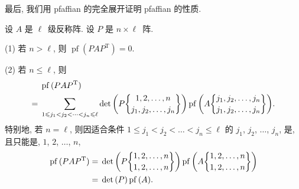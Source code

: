 \documentclass[../libro.tex]{subfiles}
\begin{document}
最后, 我们用 pfaffian 的完全展开证明 pfaffian 的性质.

\clearpage

\begin{theorem}
    设 \(A\) 是 \(\ell\)~级反称阵.
    设 \(P\) 是 \(n \times \ell\)~阵.

    (1)
    若 \(n > \ell\),
    则 \(\operatorname{pf} {(P A P^{\mathrm{T}})} = 0\).

    (2)
    若 \(n \leq \ell\),
    则
    \begin{align*}
        &
        \operatorname{pf} {(P A P^{\mathrm{T}})}
        \\
        = {} &
        \sum_{1 \leq j_1 < j_2 < \dots < j_{n} \leq \ell}
        {\det {\left(
                    P\submat{1,2,\dots,n}{j_1,j_2,\dots,j_{n}}
            \right)}
            \operatorname{pf} {\left(
                    A\submat{j_1,j_2,\dots,j_{n}}{j_1,j_2,\dots,j_{n}}
        \right)}}.
    \end{align*}
    特别地, 若 \(n = \ell\),
    则因适合条件
    \(1 \leq j_1 < j_2 < \dots < j_{n} \leq \ell\)
    的
    \(j_1\), \(j_2\), \(\dots\), \(j_{n}\),
    是, 且只能是,
    \(1\), \(2\), \(\dots\), \(n\),
    \begin{align*}
        \operatorname{pf} {(P A P^{\mathrm{T}})}
        = {} &
        \det {\left(
                P\submat{1,2,\dots,n}{1,2,\dots,n}
        \right)}
        \operatorname{pf} {\left(
                A\submat{1,2,\dots,n}{1,2,\dots,n}
        \right)}
        \\
        = {} &
        \det {(P)} \operatorname{pf} {(A)}.
    \end{align*}
\end{theorem}
\end{document}
